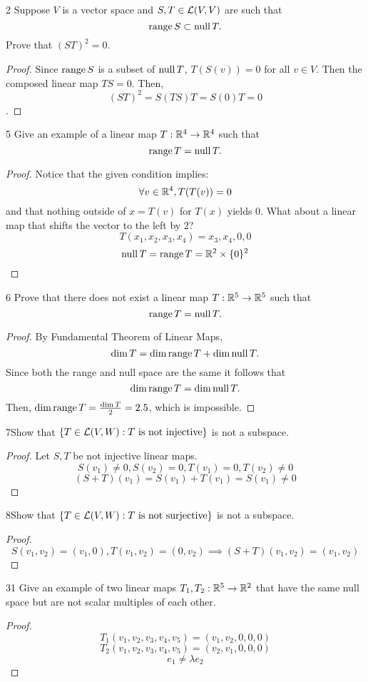 \documentclass[12pt, letterpaper]{article}
\begin{document}
\begin{problem}
{2} Suppose $V$ is a vector space and $S,T\in\mathcal{L}(V,V)$ are such that
$$\operatorname{range} S\subset\operatorname{null} T.$$
Prove that $(ST)^2=0$.
\end{problem}
\begin{proof}
Since $\operatorname{range} S$ is a subset of $\operatorname{null} T$, 
$T(S(v))=0$ for all $v\in V$. Then the composed 
linear map $TS=0$. Then,
$$(ST)^2=S(TS)T=S(0)T=0$$.
\end{proof}

\begin{problem}
{5} Give an example of a linear map $T:\mathbb{R}^4\to\mathbb{R}^4$ such that
$$\operatorname{range} T=\operatorname{null} T.$$
\end{problem}
\begin{proof}
Notice that the given condition implies: $$\forall v\in\mathbb{R}^4,T(T(v))=0$$
and that nothing outside of $x=T(v)$ for $T(x)$ yields 0.
What about a linear map that shifts the vector to the left by 2?
$$T(x_1,x_2,x_3,x_4)=x_3,x_4,0,0$$
$$\operatorname{null} T=\operatorname{range} T=\mathbb{R}^2\times\{0\}^2$$
\end{proof}

\begin{problem}
{6} Prove that there does not exist a linear map $T:\mathbb{R}^5\to\mathbb{R}^5$ such that
$$\operatorname{range} T=\operatorname{null} T.$$
\end{problem}
\begin{proof}
By Fundamental Theorem of Linear Maps,
$$\dim T=\dim\operatorname{range} T+\dim\operatorname{null} T.$$
Since both the range and null space are the same it follows that
$$\dim\operatorname{range} T= \dim\operatorname{null} T.$$
Then, $\dim\operatorname{range} T= \frac{\dim T}{2} = 2.5$, which is impossible.
\end{proof}

\begin{problem}
{7}Show that 
$\{T\in\mathcal{L}(V,W):T \text{ is not injective}\}$ is not a subspace.
\end{problem}
\begin{proof}
Let $S,T$ be not injective linear maps.
$$S(v_1)\neq0,S(v_2)=0,T(v_1)=0,T(v_2)\neq0$$
$$(S+T)(v_1)=S(v_1)+T(v_1)=S(v_1)\neq0$$
\end{proof}

\begin{problem}
{8}Show that 
$\{T\in\mathcal{L}(V,W):T \text{ is not surjective}\}$ is not a subspace.
\end{problem}
\begin{proof}
$$S(v_1,v_2)=(v_1,0),T(v_1,v_2)=(0,v_2)\implies(S+T)(v_1,v_2)=(v_1,v_2)$$
\end{proof}

\begin{problem}
{31} Give an example of two linear maps 
$T_1,T_2:\mathbb{R}^5\to\mathbb{R}^2$ that have the same null space but are not scalar multiples of each other.
\end{problem}
\begin{proof}
$$T_1(v_1,v_2,v_3,v_4,v_5)=(v_1,v_2,0,0,0)$$
$$T_2(v_1,v_2,v_3,v_4,v_5)=(v_2,v_1,0,0,0)$$
$$e_1\neq\lambda e_2$$
\end{proof}
\end{document}
